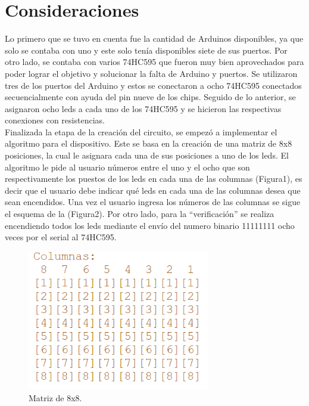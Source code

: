 \documentclass{article}
\begin{document}
\section{Consideraciones} \label{consideraciones}
Lo primero que se tuvo en cuenta fue la cantidad de Arduinos disponibles, ya que solo se contaba con uno y este solo tenía disponibles siete de sus puertos. Por otro lado, se contaba con varios 74HC595 que fueron muy bien aprovechados para poder lograr el objetivo y solucionar la falta de Arduino y puertos. Se utilizaron tres de los puertos del Arduino y estos se conectaron a ocho 74HC595 conectados secuencialmente con ayuda del pin nueve de los chips. Seguido de lo anterior, se asignaron ocho leds a cada uno de los 74HC595 y se hicieron las respectivas conexiones con resistencias.\\
Finalizada la etapa de la creación del circuito, se empezó a implementar el algoritmo para el dispositivo. Este se basa en la creación de una matriz de 8x8 posiciones, la cual le asignara cada una de sus posiciones a uno de los leds. El algoritmo le pide al usuario números entre el uno y el ocho que son respectivamente los puestos de los leds en cada una de las columnas (Figura1), es decir que el usuario debe indicar qué leds en cada una de las columnas desea que sean encendidos. Una vez el usuario ingresa los números de las columnas se sigue el esquema de la (Figura2). Por otro lado, para la “verificación” se realiza encendiendo todos los leds mediante el envío del numero binario 11111111 ocho veces por el serial al 74HC595.

\begin{figure}[h]
\includegraphics[width=8cm]{Figura1.png}
\centering
\caption{Matriz de 8x8.}
\label{fig:Matriz}
\end{figure}
\end{document}
